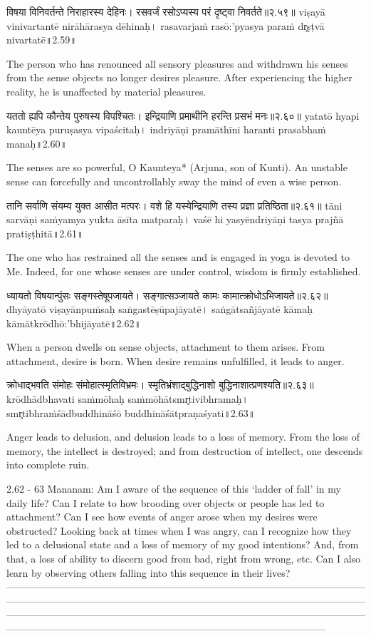 विषया विनिवर्तन्ते निराहारस्य देहिनः।
 रसवर्जं रसोऽप्यस्य परं दृष्ट्वा निवर्तते॥२.५९॥
viṣayā vinivartantē nirāhārasya dēhinaḥ।
rasavarjaṁ rasō:'pyasya paraṁ dr̥ṣṭvā nivartatē॥2.59॥

The person who has renounced all sensory pleasures and withdrawn his senses from the sense objects no longer desires pleasure. After experiencing the higher reality, he is unaffected by material pleasures.


यततो ह्यपि कौन्तेय पुरुषस्य विपश्चितः। 
इन्द्रियाणि प्रमाथीनि हरन्ति प्रसभं मनः॥२.६०॥
yatatō hyapi kauntēya puruṣasya vipaścitaḥ। 
indriyāṇi pramāthīni haranti prasabhaṁ manaḥ॥2.60॥

The senses are so powerful, O Kaunteya* (Arjuna, son of Kunti). An unstable sense can forcefully and uncontrollably sway the mind of even a wise person.


तानि सर्वाणि संयम्य युक्त आसीत मत्परः।
 वशे हि यस्येन्द्रियाणि तस्य प्रज्ञा प्रतिष्ठिता॥२.६१॥
tāni sarvāṇi saṁyamya yukta āsīta matparaḥ।
vaśē hi yasyēndriyāṇi tasya prajñā pratiṣṭhitā॥2.61॥

The one who has restrained all the senses and is engaged in yoga is devoted to Me. Indeed, for one whose senses are under control, wisdom is firmly established. 


ध्यायतो विषयान्पुंसः सङ्गस्तेषूपजायते। 
सङ्गात्सञ्जायते कामः कामात्क्रोधोऽभिजायते॥२.६२॥
dhyāyatō viṣayānpuṁsaḥ saṅgastēṣūpajāyatē। 
saṅgātsañjāyatē kāmaḥ kāmātkrōdhō:'bhijāyatē॥2.62॥

When a person dwells on sense objects, attachment to them arises. From attachment, desire is born. When desire remains unfulfilled, it leads to anger.


क्रोधाद्भवति संमोहः संमोहात्स्मृतिविभ्रमः। 
स्मृतिभ्रंशाद्बुद्धिनाशो बुद्धिनाशात्प्रणश्यति॥२.६३॥
krōdhādbhavati saṁmōhaḥ saṁmōhātsmr̥tivibhramaḥ। 
smr̥tibhraṁśādbuddhināśō buddhināśātpraṇaśyati॥2.63॥


Anger leads to delusion, and delusion leads to a loss of memory. From the loss of memory, the intellect is destroyed; and from destruction of intellect, one descends into complete ruin.

2.62 - 63 Mananam:
Am I aware of the sequence of this ‘ladder of fall’ in my daily life? Can I relate to how brooding over objects or people has led to attachment? Can I see how events of anger arose when my desires were obstructed?
Looking back at times when I was angry, can I recognize how they led to a delusional state and a loss of memory of my good intentions? And, from that, a loss of ability to discern good from bad, right from wrong, etc. Can I also learn by observing others falling into this sequence in their lives?
—---------------------------------------------------------------------------------------------------------------------------------------------------------------------------------------------------------------------------------------------------------------------------------------------------------------------------------------------------------------------------------------------------------------------------------
 

